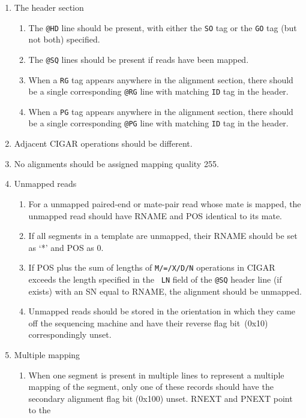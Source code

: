 \documentclass[10pt]{article}
\begin{document}
\begin{enumerate}
\item The header section
  \begin{enumerate}[label=\arabic*]
  \item The {\tt @HD} line should be present, with either the {\tt SO} tag
    or the {\tt GO} tag (but not both) specified.
  \item The {\tt @SQ} lines should be present if reads have been mapped.
  \item When a {\tt RG} tag appears anywhere in the alignment section,
    there should be a single corresponding {\tt @RG} line with matching
    {\tt ID} tag in the header.
  \item When a {\tt PG} tag appears anywhere in the alignment section,
    there should be a single corresponding {\tt @PG} line with matching
    {\tt ID} tag in the header.
  \end{enumerate}
\item Adjacent CIGAR operations should be different.
\item No alignments should be assigned mapping quality 255.
\item Unmapped reads
  \begin{enumerate}[label=\arabic*]
  \item For a unmapped paired-end or mate-pair read whose mate is
    mapped, the unmapped read should have {\sf RNAME} and {\sf POS}
    identical to its mate.
  \item If all segments in a template are unmapped, their {\sf RNAME}
    should be set as `*' and {\sf POS} as 0.
  \item If {\sf POS} plus the sum of lengths of {\tt M/=/X/D/N}
    operations in {\sf CIGAR} exceeds the length specified in the {\tt
      LN} field of the {\tt @SQ} header line (if exists) with an SN
    equal to {\sf RNAME}, the alignment should be unmapped.
  \item Unmapped reads should be stored in the orientation in which they came
    off the sequencing machine and have their {\sf reverse} flag bit~(0x10)
    correspondingly unset.
  \end{enumerate}
\item Multiple mapping
  \begin{enumerate}[label=\arabic*]
  \item When one segment is present in multiple lines to represent a multiple
	mapping of the segment, only one of these records should have the secondary
	alignment flag bit (0x100) unset. {\sf RNEXT} and {\sf PNEXT} point to the

\end{enumerate}
\end{enumerate}
\end{document}
